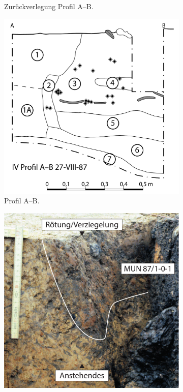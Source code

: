 \begin{figure}[p]
\begin{minipage}[b]{.55\textwidth}
\begin{subfigure}[t]{.47\textwidth}
			\caption{Zurückverlegung Profil A--B.}
			\label{fig:MUN87-1_3Pl_T40Profil_C}
		\end{subfigure}
		\begin{subfigure}[t]{.47\textwidth}
			\centering
			\includegraphics[width = \textwidth]{fig/MUN87-1_3Pl_T40Profil_D.pdf}
			\caption{Profil A--B.}
			\label{fig:MUN87-1_3Pl_T40Profil_D}
		\end{subfigure}\hspace{1em}%
		\begin{subfigure}[t]{.47\textwidth}
			\centering
			\includegraphics[width = \textwidth]{fig/MUN87-1_3Pl_T40Profil_E.pdf}

\end{subfigure}
\end{minipage}
\end{figure}
